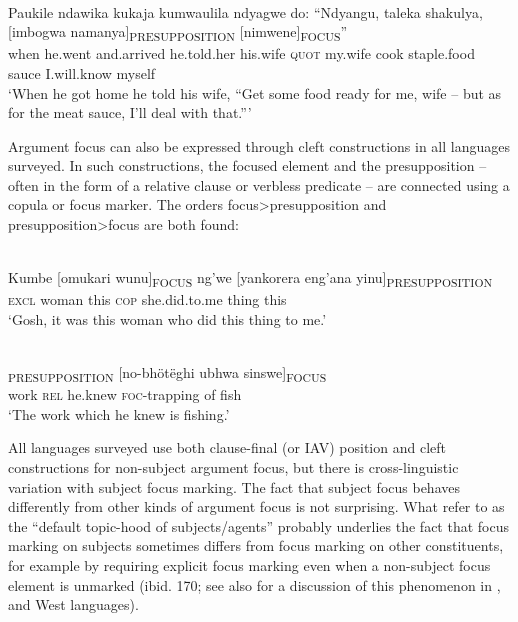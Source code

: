 \documentclass[output=paper]{langsci/langscibook}
\begin{document}
\ea\label{ex:17.nicolle}
\\
\gll Paukile ndawika kukaja kumwaulila ndyagwe do: “Ndyangu, taleka shakulya, [imbogwa namanya]\textsubscript{PRESUPPOSITION} [nimwene]\textsubscript{FOCUS}”\\
when he.went and.arrived he.told.her his.wife \textsc{quot} my.wife cook staple.food {\db}sauce I.will.know {\db}myself \\
\glt ‘When he got home he told his wife, “Get some food ready for me, wife -- but as for the meat sauce, I’ll deal with that.”’
\z

Argument focus can also be expressed through cleft constructions in all languages surveyed. In such constructions, the focused element and the presupposition -- often in the form of a relative clause or verbless predicate -- are connected using a copula or focus marker. The orders focus>presupposition and presupposition>focus are both found:

\ea\label{ex:18.nicolle}
\\
\gll Kumbe [omukari wunu]\textsubscript{FOCUS} ng’we [yankorera eng’ana yinu]\textsubscript{PRESUPPOSITION}\\
\textsc{excl} {\db}woman this \textsc{cop} {\db}she.did.to.me thing this \\
\glt ‘Gosh, it was this woman who did this thing to me.’
\z

\ea\label{ex:19.nicolle}
\\
\textsubscript{PRESUPPOSITION} [no-bhötëghi ubhwa sinswe]\textsubscript{FOCUS}\\
{\db}work \textsc{rel} he.knew {\db}\textsc{foc}-trapping of fish \\
\glt ‘The work which he knew is fishing.’
\z

All languages surveyed use both clause-final (or IAV) position and cleft constructions for non-subject argument focus, but there is cross-linguistic variation with subject focus marking. The fact that subject focus behaves differently from other kinds of argument focus is not surprising. What \citet[159]{gueldemannetal2015} refer to as the “default topic-hood of subjects/agents” probably underlies the fact that focus marking on subjects sometimes differs from focus marking on other constituents, for example by requiring explicit focus marking even when a non-subject focus element is unmarked (ibid. 170; see also \citealt{fiedleretal2010} for a discussion of this phenomenon in ,  and West  languages).
\end{document}
